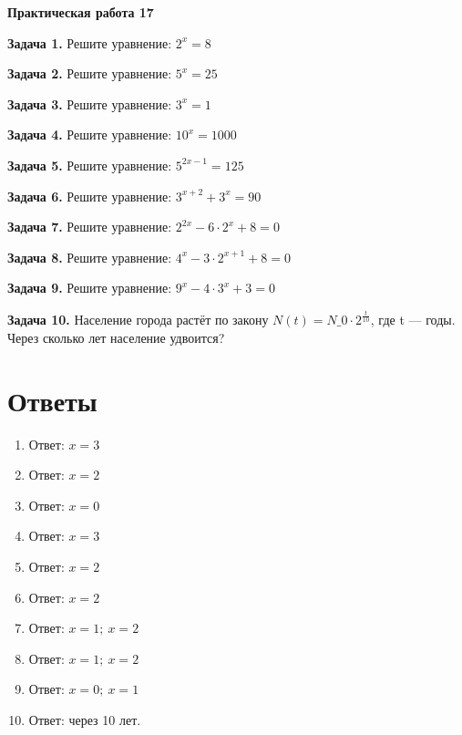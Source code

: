 \documentclass{umk-matematika}
\begin{document}
\begin{center}
{\Large\bfseries Практическая работа 17}
\end{center}
\vspace{0.5cm}

\textbf{Задача 1.} Решите уравнение: $2^x = 8$\par\vspace{10pt}
\textbf{Задача 2.} Решите уравнение: $5^x = 25$\par\vspace{10pt}
\textbf{Задача 3.} Решите уравнение: $3^x = 1$\par\vspace{10pt}
\textbf{Задача 4.} Решите уравнение: $10^x = 1000$\par\vspace{10pt}
\textbf{Задача 5.} Решите уравнение: $5^{2x-1} = 125$\par\vspace{10pt}
\textbf{Задача 6.} Решите уравнение: $3^{x+2} + 3^x = 90$\par\vspace{10pt}
\textbf{Задача 7.} Решите уравнение: $2^{2x} - 6 \cdot 2^x + 8 = 0$\par\vspace{10pt}
\textbf{Задача 8.} Решите уравнение: $4^x - 3 \cdot 2^{x+1} + 8 = 0$\par\vspace{10pt}
\textbf{Задача 9.} Решите уравнение: $9^x - 4 \cdot 3^x + 3 = 0$\par\vspace{10pt}
\textbf{Задача 10.} Население города растёт по закону $N(t) = N\_0 \cdot 2^{\frac{t}{10}}$, где t — годы. Через сколько лет население удвоится?\par\vspace{10pt}
\newpage
\section*{Ответы}

\begin{enumerate}
  \item Ответ: $x = 3$
  \item Ответ: $x = 2$
  \item Ответ: $x = 0$
  \item Ответ: $x = 3$
  \item Ответ: $x = 2$
  \item Ответ: $x = 2$
  \item Ответ: $x = 1;\ x = 2$
  \item Ответ: $x = 1;\ x = 2$
  \item Ответ: $x = 0;\ x = 1$
  \item Ответ: через 10 лет.
\end{enumerate}
\end{document}

